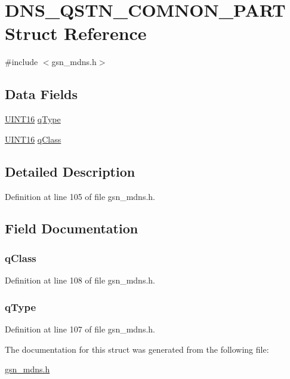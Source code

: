 \hypertarget{a00014}{
\section{DNS\_\-QSTN\_\-COMNON\_\-PART Struct Reference}
\label{a00014}
}


{\ttfamily \#include $<$gsn\_\-mdns.h$>$}

\subsection*{Data Fields}
\begin{DoxyCompactItemize}
\item 
\hyperlink{a00660_ga09f1a1fb2293e33483cc8d44aefb1eb1}{UINT16} \hyperlink{a00014_af988990cedc3c53e6fb79dec44129dd9}{qType}
\item 
\hyperlink{a00660_ga09f1a1fb2293e33483cc8d44aefb1eb1}{UINT16} \hyperlink{a00014_afa93f8c57cd3599611c2bdd66fe4433b}{qClass}
\end{DoxyCompactItemize}


\subsection{Detailed Description}


Definition at line 105 of file gsn\_\-mdns.h.



\subsection{Field Documentation}
\hypertarget{a00014_afa93f8c57cd3599611c2bdd66fe4433b}{
\subsubsection[{qClass}]{ {\bf qClass}}}
\label{a00014_afa93f8c57cd3599611c2bdd66fe4433b}


Definition at line 108 of file gsn\_\-mdns.h.

\hypertarget{a00014_af988990cedc3c53e6fb79dec44129dd9}{
\subsubsection[{qType}]{ {\bf qType}}}
\label{a00014_af988990cedc3c53e6fb79dec44129dd9}


Definition at line 107 of file gsn\_\-mdns.h.



The documentation for this struct was generated from the following file:\begin{DoxyCompactItemize}
\item 
\hyperlink{a00526}{gsn\_\-mdns.h}\end{DoxyCompactItemize}

